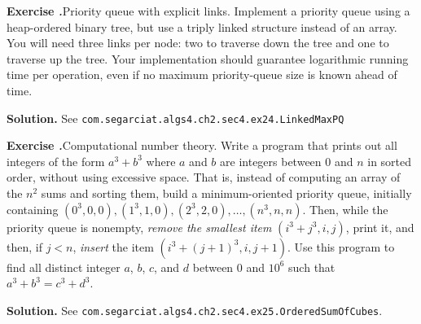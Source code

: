 \documentclass[12pt, a4paper]{article}
\newenvironment{ex}[2][Exercise]
{\par\medskip\noindent \textbf{#1 #2.}}
{\medskip}
\newenvironment{sol}[1][Solution]
{\par\medskip\noindent \textbf{#1.} }
{\medskip}
\begin{document}
	\begin{ex}{24}
		\emph{Priority queue with explicit links}. Implement a priority queue
		using a heap-ordered binary tree, but use a triply linked structure instead
		of an array. You will need three links per node: two to traverse down the
		tree and one to traverse up the tree. Your implementation should guarantee
		logarithmic running time per operation, even if no maximum priority-queue
		size is known ahead of time.
	\end{ex}
	\begin{sol}
		See \texttt{com.segarciat.algs4.ch2.sec4.ex24.LinkedMaxPQ}
	\end{sol}
	\begin{ex}{25}
		\emph{Computational number theory}. Write a program that prints out all integers of
		the form $a^3+b^3$ where $a$ and $b$ are integers between $0$ and $n$ in sorted
		order, without using excessive space. That is, instead of computing an array
		of the $n^2$ sums and sorting them, build a minimum-oriented priority queue,
		initially containing $(0^3, 0, 0), (1^3, 1, 0), (2^3,2,0),\ldots,(n^3,n,n)$.
		Then, while the priority queue is nonempty, \emph{remove the smallest item}
		$(i^3+j^3, i, j)$, print it, and then, if $j < n$, \emph{insert} the item
		$(i^3 + (j+1)^3, i, j+1)$. Use this program to find all distinct integer
		$a$, $b$, $c$, and $d$ between $0$ and $10^6$ such that $a^3+b^3=c^3+d^3$.
	\end{ex}
	\begin{sol}
		See \texttt{com.segarciat.algs4.ch2.sec4.ex25.OrderedSumOfCubes}.
	\end{sol}
	
\end{document}
